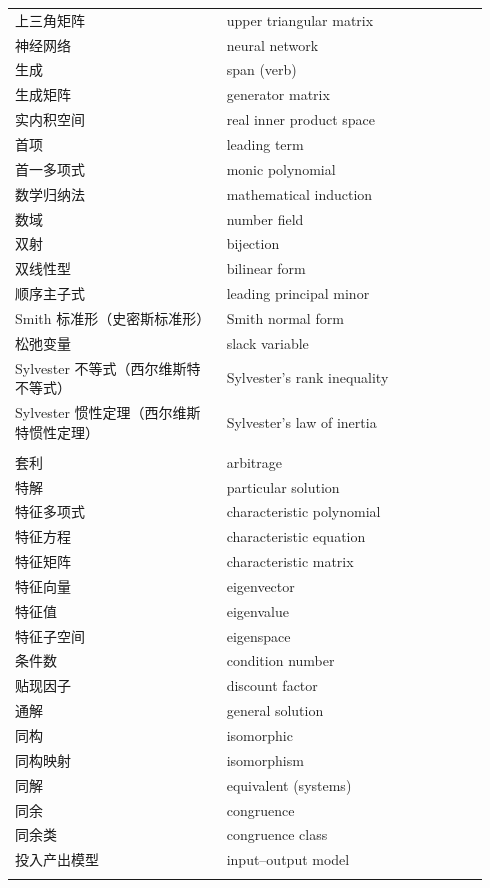 {\begin{longtable}{p{0.42\linewidth}p{0.52\linewidth}}
		上三角矩阵 & upper triangular matrix \\
		神经网络 & neural network \\
		生成 & span (verb) \\
		生成矩阵 & generator matrix \\
		实内积空间 & real inner product space \\
		首项 & leading term \\
		首一多项式 & monic polynomial \\
		数学归纳法 & mathematical induction \\
		数域 & number field \\
		双射 & bijection \\
		双线性型 & bilinear form \\
		顺序主子式 & leading principal minor \\
		Smith 标准形（史密斯标准形） & Smith normal form \\
		松弛变量 & slack variable \\
		Sylvester 不等式（西尔维斯特不等式） & Sylvester's rank inequality \\
		Sylvester 惯性定理（西尔维斯特惯性定理） & Sylvester's law of inertia \\
		\addlinespace
		\multicolumn{2}{l}{\textbf{\sffamily T}} \\
		套利 & arbitrage \\
		特解 & particular solution \\
		特征多项式 & characteristic polynomial \\
		特征方程 & characteristic equation \\
		特征矩阵 & characteristic matrix \\
		特征向量 & eigenvector \\
		特征值 & eigenvalue \\
		特征子空间 & eigenspace \\
		条件数 & condition number \\
		贴现因子 & discount factor \\
		通解 & general solution \\
		同构 & isomorphic \\
		同构映射 & isomorphism \\
		同解 & equivalent (systems) \\
		同余 & congruence \\
		同余类 & congruence class \\
		投入产出模型 & input–output model \\
		\addlinespace
		\multicolumn{2}{l}{\textbf{\sffamily V}} \\

\end{longtable}}
